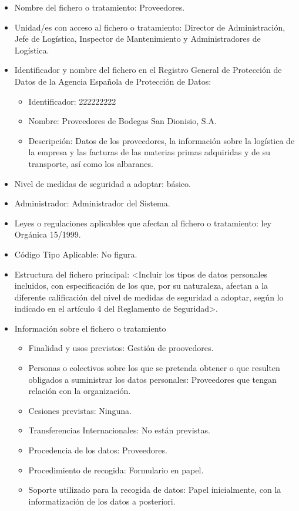 \documentclass[a4paper,11pt,bibtotoc,noliststotoc]{scrbook}
\newcommand{\laorganizacion}{Bodegas San Dionisio, S.A.}
\begin{document}
\begin{itemize}
\item Nombre del fichero o tratamiento: Proveedores.

\item Unidad/es con acceso al fichero o tratamiento: Director de Administración, Jefe de Logística, Inspector de Mantenimiento y Administradores de Logística.

\item Identificador y nombre del fichero en el Registro General de Protección de Datos de la Agencia Española de Protección de Datos: 
	\begin{itemize}
	\item Identificador: 222222222
	\item Nombre: Proveedores de \laorganizacion
	\item Descripción: Datos de los proveedores, la información sobre la logística de la empresa y las facturas de las materias primas adquiridas y de su transporte, así como los albaranes.
	\end{itemize}

\item Nivel de medidas de seguridad a adoptar: básico.

\item Administrador: Administrador del Sistema.

\item Leyes o regulaciones aplicables que afectan al fichero o tratamiento: ley Orgánica 15/1999.

\item Código Tipo Aplicable: No figura.

\item Estructura del fichero principal: <Incluir los tipos de datos personales incluidos, con especificación de los que, por su naturaleza, afectan a la diferente calificación del nivel de medidas de seguridad a adoptar, según lo indicado en el artículo 4 del Reglamento de Seguridad>.

\item Información sobre el fichero o tratamiento
	\begin{itemize}
	\item Finalidad y usos previstos: Gestión de proovedores.
	\item Personas o colectivos sobre los que se pretenda obtener o que resulten obligados a suministrar los datos personales: Proveedores que tengan relación con la organización.
	\item Cesiones previstas: Ninguna.
	\item Transferencias Internacionales: No están previstas.
	\item Procedencia de los datos: Proveedores.
	\item Procedimiento de recogida: Formulario en papel.
	\item Soporte utilizado para la recogida de datos: Papel inicialmente, con la informatización de los datos a posteriori.
	\end{itemize}


\end{itemize}
\end{document}
